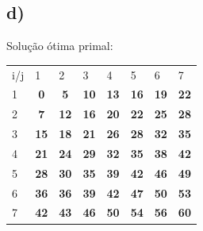 \documentclass[11pt]{article} %
\begin{document}
\newpage

\subsection*{d)}
Solução ótima primal:

\begin{table}[h]
\centering
\begin{tabular}{lccccccc}
i/j                    & \multicolumn{1}{l}{1}            & \multicolumn{1}{l}{2}            & \multicolumn{1}{l}{3}            & \multicolumn{1}{l}{4}            & \multicolumn{1}{l}{5}            & \multicolumn{1}{l}{6}            & \multicolumn{1}{l}{7}            \\ \cline{2-8} 
\multicolumn{1}{l|}{1} & \multicolumn{1}{c|}{\textbf{0}}  & \multicolumn{1}{c|}{\textbf{5}}  & \multicolumn{1}{c|}{\textbf{10}} & \multicolumn{1}{c|}{\textbf{13}} & \multicolumn{1}{c|}{\textbf{16}} & \multicolumn{1}{c|}{\textbf{19}} & \multicolumn{1}{c|}{\textbf{22}} \\ \cline{2-8} 
\multicolumn{1}{l|}{2} & \multicolumn{1}{c|}{\textbf{7}}  & \multicolumn{1}{c|}{\textbf{12}} & \multicolumn{1}{c|}{\textbf{16}} & \multicolumn{1}{c|}{\textbf{20}} & \multicolumn{1}{c|}{\textbf{22}} & \multicolumn{1}{c|}{\textbf{25}} & \multicolumn{1}{c|}{\textbf{28}} \\ \cline{2-8} 
\multicolumn{1}{l|}{3} & \multicolumn{1}{c|}{\textbf{15}} & \multicolumn{1}{c|}{\textbf{18}} & \multicolumn{1}{c|}{\textbf{21}} & \multicolumn{1}{c|}{\textbf{26}} & \multicolumn{1}{c|}{\textbf{28}} & \multicolumn{1}{c|}{\textbf{32}} & \multicolumn{1}{c|}{\textbf{35}} \\ \cline{2-8} 
\multicolumn{1}{l|}{4} & \multicolumn{1}{c|}{\textbf{21}} & \multicolumn{1}{c|}{\textbf{24}} & \multicolumn{1}{c|}{\textbf{29}} & \multicolumn{1}{c|}{\textbf{32}} & \multicolumn{1}{c|}{\textbf{35}} & \multicolumn{1}{c|}{\textbf{38}} & \multicolumn{1}{c|}{\textbf{42}} \\ \cline{2-8} 
\multicolumn{1}{l|}{5} & \multicolumn{1}{c|}{\textbf{28}} & \multicolumn{1}{c|}{\textbf{30}} & \multicolumn{1}{c|}{\textbf{35}} & \multicolumn{1}{c|}{\textbf{39}} & \multicolumn{1}{c|}{\textbf{42}} & \multicolumn{1}{c|}{\textbf{46}} & \multicolumn{1}{c|}{\textbf{49}} \\ \cline{2-8} 
\multicolumn{1}{l|}{6} & \multicolumn{1}{c|}{\textbf{36}} & \multicolumn{1}{c|}{\textbf{36}} & \multicolumn{1}{c|}{\textbf{39}} & \multicolumn{1}{c|}{\textbf{42}} & \multicolumn{1}{c|}{\textbf{47}} & \multicolumn{1}{c|}{\textbf{50}} & \multicolumn{1}{c|}{\textbf{53}} \\ \cline{2-8} 
\multicolumn{1}{l|}{7} & \multicolumn{1}{c|}{\textbf{42}} & \multicolumn{1}{c|}{\textbf{43}}  & \multicolumn{1}{c|}{\textbf{46}} & \multicolumn{1}{c|}{\textbf{50}} & \multicolumn{1}{c|}{\textbf{54}} & \multicolumn{1}{c|}{\textbf{56}} & \multicolumn{1}{c|}{\textbf{60}} \\ \cline{2-8} 
\end{tabular}
\end{table}
\end{document}
